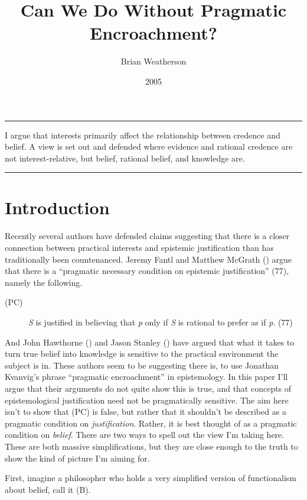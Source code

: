 \documentclass[
  10pt,
  letterpaper,
  DIV=11,
  numbers=noendperiod,
  twoside]{scrartcl}
\title{Can We Do Without Pragmatic Encroachment?}
\author{Brian Weatherson}
\date{2005}
\renewenvironment{abstract}
 {\vspace{-1.25cm}
 \quotation\small\noindent\rule{\linewidth}{.5pt}\par\smallskip
 \noindent }
 {\par\noindent\rule{\linewidth}{.5pt}\endquotation}
\begin{document}
\maketitle
\begin{abstract}
I argue that interests primarily affect the relationship between
credence and belief. A view is set out and defended where evidence and
rational credence are not interest-relative, but belief, rational
belief, and knowledge are.
\end{abstract}

\section{Introduction}\label{introduction}

Recently several authors have defended claims suggesting that there is a
closer connection between practical interests and epistemic
justification than has traditionally been countenanced. Jeremy Fantl and
Matthew McGrath () argue that there is a
``pragmatic necessary condition on epistemic justification'' (77),
namely the following.

\begin{description}
\item[(PC)]
\emph{S} is justified in believing that \emph{p} only if \emph{S} is
rational to prefer as if \emph{p}. (77)
\end{description}

And John Hawthorne () and Jason
Stanley () have argued that what
it takes to turn true belief into knowledge is sensitive to the
practical environment the subject is in. These authors seem to be
suggesting there is, to use Jonathan Kvanvig's phrase ``pragmatic
encroachment'' in epistemology. In this paper I'll argue that their
arguments do not quite show this is true, and that concepts of
epistemological justification need not be pragmatically sensitive. The
aim here isn't to show that (PC) is false, but rather that it shouldn't
be described as a pragmatic condition on \emph{justification}. Rather,
it is best thought of as a pragmatic condition on \emph{belief}. There
are two ways to spell out the view I'm taking here. These are both
massive simplifications, but they are close enough to the truth to show
the kind of picture I'm aiming for.

First, imagine a philosopher who holds a very simplified version of
functionalism about belief, call it (B).
\end{document}
